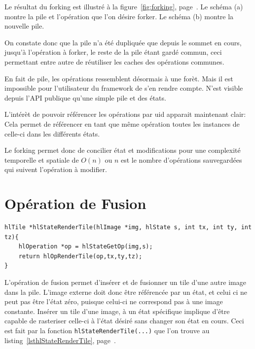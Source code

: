 			Le résultat du forking est illustré à la figure~\ref{fig:forking}, page~\pageref{fig:forking}. Le schéma (a) montre la pile et l'opération
			que l'on désire forker. Le schéma (b) montre la nouvelle pile. 
			
			On constate donc que la pile n'a été dupliquée que depuis le sommet en cours, jusqu'à l'opération à forker, le reste de la pile 
			étant gardé commun, ceci permettant entre autre de réutiliser les caches des opérations communes. 

			En fait de pile, les opérations ressemblent désormais à une forèt. Mais il est impossible pour l'utilisateur du framework de s'en
			rendre compte. N'est visible depuis l'API publique qu'une simple pile et des états.

			L'intérèt de pouvoir référencer les opérations par uid apparait maintenant clair: Cela permet de référencer en tant que même 
			opération toutes les instances de celle-ci dans les différents états.  

			Le forking permet donc de concilier état et modifications pour une complexité temporelle et spatiale de $O(n)$ ou $n$ est le nombre
			d'opérations sauvegardées qui suivent l'opération à modifier.
	\section{Opération de Fusion}
		\begin{lstlisting}[float,caption={Rasterisation d'opérations},frame=tb,label=lsthlStateRenderTile]
hlTile *hlStateRenderTile(hlImage *img, hlState s, int tx, int ty, int tz){
	hlOperation *op = hlStateGetOp(img,s);
	return hlOpRenderTile(op,tx,ty,tz);
}
		\end{lstlisting}
		L'opération de fusion permet d'insérer et de fusionner un tile d'une autre image dans la pile. L'image externe doit donc être référencée par
		un état, et celui ci ne peut pas être l'état zéro, puisque celui-ci ne correspond pas à une image constante.  Insérer un tile d'une image,
		à un état spécifique implique d'être capable de rasteriser celle-ci à l'état désiré sans changer son état en cours. Ceci est fait par la
		fonction \lstinline$hlStateRenderTile(...)$ que l'on trouve au listing~\ref{lsthlStateRenderTile}, page~\pageref{lsthlStateRenderTile}.

